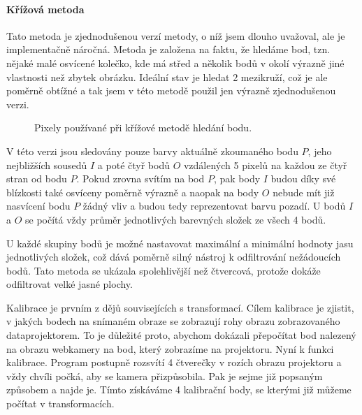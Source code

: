 \documentclass[twoside,12pt]{article}
\newcommand{\podpodsekce}[1]{\paragraph{#1}\quad\vskip 6pt}
\begin{document}
\podpodsekce{Křížová metoda}

Tato metoda je zjednodušenou verzí metody, o níž jsem dlouho uvažoval, ale je implementačně náročná. Metoda je založena na faktu, že hledáme bod, tzn. nějaké malé osvícené kolečko, kde má střed a několik bodů v okolí výrazně jiné vlastnosti než zbytek obrázku. Ideální stav je hledat 2 mezikruží, což je ale poměrně obtížné a tak jsem v této metodě použil jen výrazně zjednodušenou verzi.

\begin{figure}[ht]
 \begin{center}
 \end{center}
 \caption{Pixely používané při křížové metodě hledání bodu.}
\end{figure}

V této verzi jsou sledovány pouze barvy aktuálně zkoumaného bodu $P$, jeho nejbližších sousedů $I$ a poté čtyř bodů $O$ vzdálených 5 pixelů na každou ze čtyř stran od bodu $P$. Pokud zrovna svítím na bod $P$, pak body $I$ budou díky své blízkosti také osvíceny poměrně výrazně a naopak na body $O$ nebude mít již nasvícení bodu $P$ žádný vliv a budou tedy reprezentovat barvu pozadí. U bodů $I$ a $O$ se počítá vždy průměr jednotlivých barevných složek ze všech 4 bodů. 

U každé skupiny bodů je možné nastavovat maximální a minimální hodnoty jasu jednotlivých složek, což dává poměrně silný nástroj k odfiltrování nežádoucích bodů. Tato metoda se ukázala spolehlivější než čtvercová, protože dokáže odfiltrovat velké jasné plochy.

Kalibrace je prvním z dějů souvisejících s transformací. Cílem kalibrace je zjistit, v jakých bodech na snímaném obraze se zobrazují rohy obrazu zobrazovaného dataprojektorem. To je důležité proto, abychom dokázali přepočítat bod nalezený na obrazu webkamery na bod, který zobrazíme na projektoru. Nyní k funkci kalibrace. Program postupně rozsvítí 4 čtverečky v rozích obrazu projektoru a vždy chvíli počká, aby se kamera přizpůsobila. Pak je sejme již popsaným způsobem a najde je. Tímto získáváme 4 kalibrační body, se kterými již můžeme počítat v transformacích.
\end{document}
